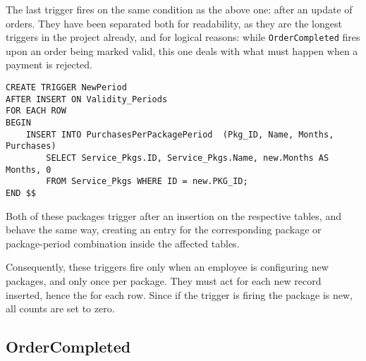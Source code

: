 The last trigger fires on the same condition as the above one: after an update of orders. They have been separated both for readability, as they are the longest triggers in the project already, and for logical reasons: while \texttt{OrderCompleted} fires upon an order being marked valid, this one deals with what must happen when a payment is rejected.

\begin{lstlisting}[style=SQL]
CREATE TRIGGER NewPeriod
AFTER INSERT ON Validity_Periods
FOR EACH ROW
BEGIN
    INSERT INTO PurchasesPerPackagePeriod  (Pkg_ID, Name, Months, Purchases)
        SELECT Service_Pkgs.ID, Service_Pkgs.Name, new.Months AS Months, 0
        FROM Service_Pkgs WHERE ID = new.PKG_ID;
END $$
\end{lstlisting}

Both of these packages trigger after an insertion on the respective tables, and behave the same way, creating an entry
for the corresponding package or package-period combination inside the affected tables.

Consequently, these triggers fire only when an employee is configuring new packages, and only once per package. They
must act for each new record inserted, hence the for each row. Since if the trigger is firing the package is new, all
counts are set to zero.

\subsection{OrderCompleted}


